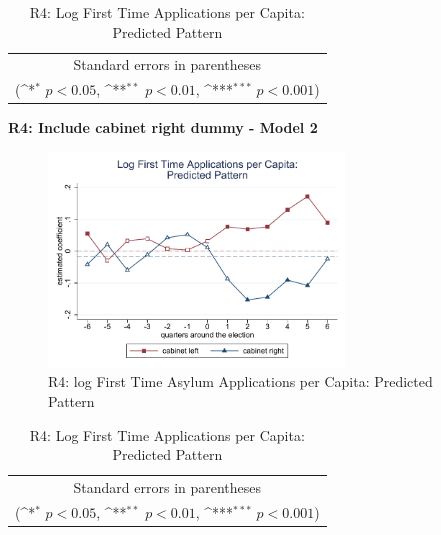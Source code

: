 \documentclass[10pt,a4paper]{scrartcl}
\begin{document}
\begin{table}[!ht]\centering
	\renewcommand{\arraystretch}{1.25}
	\def\sym#1{\ifmmode^{#1}\else\(^{#1}\)\fi}
	\caption{R4: Log First Time Applications per Capita: Predicted Pattern}
	\begin{tabular}{l*{2}{c}}
		\hline\hline
		
		\hline\hline
		\multicolumn{3}{c}{\footnotesize Standard errors in parentheses} \\
		\multicolumn{3}{c}{\footnotesize (\sym{*} \(p<0.05\), \sym{**} \(p<0.01\), \sym{***} \(p<0.001\))}\\
	\end{tabular}
\end{table}

\clearpage
\textbf{R4: Include cabinet right dummy - Model 2}
\begin{figure}[!ht]
	\centering
	\includegraphics[width=0.7\textwidth]{figures_edited/app_graph2_R4.pdf}
	\caption{R4: log First Time Asylum Applications per Capita: Predicted Pattern}
\end{figure}

\begin{table}[!ht]\centering
	\footnotesize
	\renewcommand{\arraystretch}{1.2}
	\def\sym#1{\ifmmode^{#1}\else\(^{#1}\)\fi}
	\caption{R4: Log First Time Applications per Capita: Predicted Pattern}
	\begin{tabular}{l*{2}{c}}
		\hline\hline
		
		\hline\hline
		\multicolumn{3}{c}{\footnotesize Standard errors in parentheses} \\
		\multicolumn{3}{c}{\footnotesize (\sym{*} \(p<0.05\), \sym{**} \(p<0.01\), \sym{***} \(p<0.001\))} \\
	\end{tabular}
\end{table}
\end{document}
